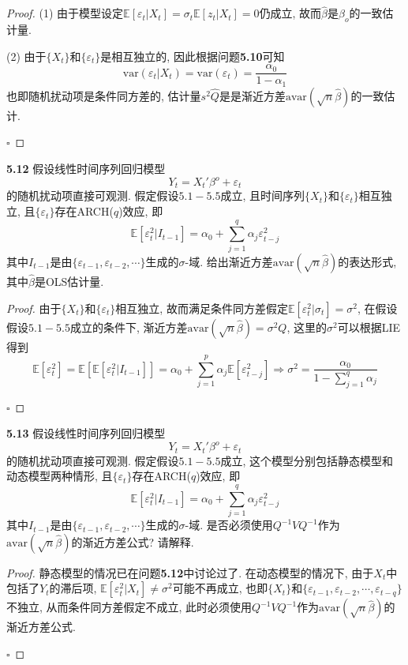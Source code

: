 \documentclass[cn,12pt,math=mtpro2,citestyle=gb7714-2015,bibstyle=gb7714-2015,twocol,mode=simple]{elegantbook}
\newcommand{\E}{\mathbb{E}}
\begin{document}
\begin{proof}
(1) 由于模型设定$\E[\varepsilon_t|X_t]=\sigma_t\E[z_t|X_t]=0$仍成立, 故而$\hat{\beta}$是$\beta_o$的一致估计量.

(2) 由于$\{X_t\}$和$\{\varepsilon_t\}$是相互独立的,  因此根据问题\textbf{5.10}可知
$$\text{var}(\varepsilon_t|X_t)=\text{var}(\varepsilon_t)=\frac{\alpha_0}{1-\alpha_1}$$
也即随机扰动项是条件同方差的, 估计量$s^2\hat{Q}$是是渐近方差$\text{avar}(\sqrt{n}\hat{\beta})$的一致估计.

$\square$
\end{proof}

\textbf{5.12} 假设线性时间序列回归模型
$$Y_t=X_t'\beta^o+\varepsilon_t$$
的随机扰动项直接可观测. 假定假设$5.1-5.5$成立, 且时间序列$\{X_t\}$和$\{\varepsilon_t\}$相互独立, 且$\{\varepsilon_t\}$存在ARCH($q$)效应, 即
$$\E[\varepsilon_t^2|I_{t-1}]=\alpha_0+\sum_{j=1}^{q}\alpha_j\varepsilon_{t-j}^2$$
其中$I_{t-1}$是由$\{\varepsilon_{t-1},\varepsilon_{t-2},\cdots\}$生成的$\sigma$-域. 给出渐近方差$\text{avar}(\sqrt{n}\hat{\beta})$的表达形式, 其中$\hat{\beta}$是OLS估计量.

\begin{proof}
由于$\{X_t\}$和$\{\varepsilon_t\}$相互独立, 故而满足条件同方差假定$\E[\varepsilon_t^2|\sigma_t]=\sigma^2$,  在假设假设$5.1-5.5$成立的条件下, 渐近方差$\text{avar}(\sqrt{n}\hat{\beta})=\sigma^2Q$, 这里的$\sigma^2$可以根据LIE得到
$$\E[\varepsilon_t^2]=\E[\E[\varepsilon_t^2|I_{t-1}]]=\alpha_0+\sum_{j=1}^{p}\alpha_j\E[\varepsilon_{t-j}^2]\Rightarrow \sigma^2=\frac{\alpha_0}{ 1-\sum_{j=1}^{q}\alpha_j}$$

$\square$
\end{proof}

\textbf{5.13} 假设线性时间序列回归模型
$$Y_t=X_t'\beta^o+\varepsilon_t$$
的随机扰动项直接可观测. 假定假设$5.1-5.5$成立, 这个模型分别包括静态模型和动态模型两种情形, 且$\{\varepsilon_t\}$存在ARCH($q$)效应, 即
$$\E[\varepsilon_t^2|I_{t-1}]=\alpha_0+\sum_{j=1}^{q}\alpha_j\varepsilon_{t-j}^2$$
其中$I_{t-1}$是由$\{\varepsilon_{t-1},\varepsilon_{t-2},\cdots\}$生成的$\sigma$-域. 是否必须使用$Q^{-1}VQ^{-1}$作为$\text{avar}(\sqrt{n}\hat{\beta})$的渐近方差公式? 请解释.

\begin{proof}
静态模型的情况已在问题\textbf{5.12}中讨论过了. 在动态模型的情况下, 由于$X_t$中包括了$Y_t$的滞后项, $\E[\varepsilon_t^2|X_t]\neq\sigma^2$可能不再成立, 也即$\{X_t\}$和$\{\varepsilon_{t-1},\varepsilon_{t-2},\cdots,\varepsilon_{t-q}\}$不独立, 从而条件同方差假定不成立, 此时必须使用$Q^{-1}VQ^{-1}$作为$\text{avar}(\sqrt{n}\hat{\beta})$的渐近方差公式.

$\square$
\end{proof}
\end{document}
